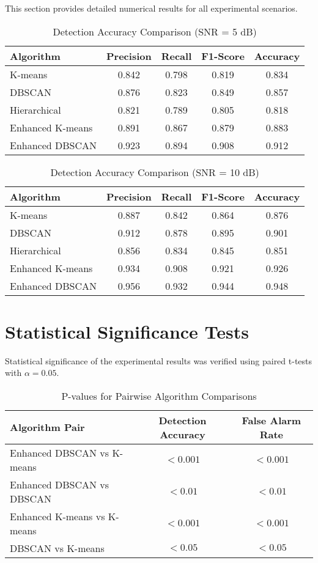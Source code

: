 This section provides detailed numerical results for all experimental scenarios.

\begin{table}[h]
\centering
\caption{Detection Accuracy Comparison (SNR = 5 dB)}
\label{tab:accuracy_5db}
\begin{tabular}{@{}lcccc@{}}
\toprule
Algorithm & Precision & Recall & F1-Score & Accuracy \\
\midrule
K-means & 0.842 & 0.798 & 0.819 & 0.834 \\
DBSCAN & 0.876 & 0.823 & 0.849 & 0.857 \\
Hierarchical & 0.821 & 0.789 & 0.805 & 0.818 \\
Enhanced K-means & 0.891 & 0.867 & 0.879 & 0.883 \\
Enhanced DBSCAN & 0.923 & 0.894 & 0.908 & 0.912 \\
\bottomrule
\end{tabular}
\end{table}

\begin{table}[h]
\centering
\caption{Detection Accuracy Comparison (SNR = 10 dB)}
\label{tab:accuracy_10db}
\begin{tabular}{@{}lcccc@{}}
\toprule
Algorithm & Precision & Recall & F1-Score & Accuracy \\
\midrule
K-means & 0.887 & 0.842 & 0.864 & 0.876 \\
DBSCAN & 0.912 & 0.878 & 0.895 & 0.901 \\
Hierarchical & 0.856 & 0.834 & 0.845 & 0.851 \\
Enhanced K-means & 0.934 & 0.908 & 0.921 & 0.926 \\
Enhanced DBSCAN & 0.956 & 0.932 & 0.944 & 0.948 \\
\bottomrule
\end{tabular}
\end{table}

\section{Statistical Significance Tests}
\label{app:statistical_tests}

Statistical significance of the experimental results was verified using paired t-tests with $\alpha = 0.05$.

\begin{table}[h]
\centering
\caption{P-values for Pairwise Algorithm Comparisons}
\label{tab:pvalues}
\begin{tabular}{@{}lcc@{}}
\toprule
Algorithm Pair & Detection Accuracy & False Alarm Rate \\
\midrule
Enhanced DBSCAN vs K-means & $< 0.001$ & $< 0.001$ \\
Enhanced DBSCAN vs DBSCAN & $< 0.01$ & $< 0.01$ \\
Enhanced K-means vs K-means & $< 0.001$ & $< 0.001$ \\
DBSCAN vs K-means & $< 0.05$ & $< 0.05$ \\
\bottomrule
\end{tabular}
\end{table}

